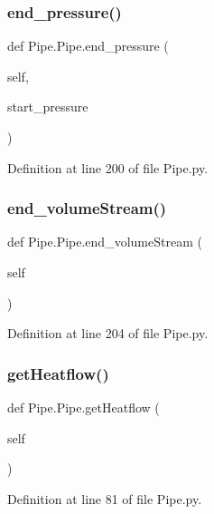 \subsubsection{\texorpdfstring{end\+\_\+pressure()}{end\_pressure()}}
{\footnotesize\ttfamily def Pipe.\+Pipe.\+end\+\_\+pressure (\begin{DoxyParamCaption}\item[{}]{self,  }\item[{}]{start\+\_\+pressure }\end{DoxyParamCaption})}



Definition at line 200 of file Pipe.\+py.

\mbox{\label{class_pipe_1_1_pipe_ae2b6ac79c8416e15bb8846739e90d0f6}} 
\subsubsection{\texorpdfstring{end\+\_\+volume\+Stream()}{end\_volumeStream()}}
{\footnotesize\ttfamily def Pipe.\+Pipe.\+end\+\_\+volume\+Stream (\begin{DoxyParamCaption}\item[{}]{self }\end{DoxyParamCaption})}



Definition at line 204 of file Pipe.\+py.

\mbox{\label{class_pipe_1_1_pipe_afbd372f6badcea91558e723eb0c81712}} 
\subsubsection{\texorpdfstring{get\+Heatflow()}{getHeatflow()}}
{\footnotesize\ttfamily def Pipe.\+Pipe.\+get\+Heatflow (\begin{DoxyParamCaption}\item[{}]{self }\end{DoxyParamCaption})}



Definition at line 81 of file Pipe.\+py.

\mbox{\label{class_pipe_1_1_pipe_a6cda251ee7a5bb112b2dbe8db6a76448}} 
